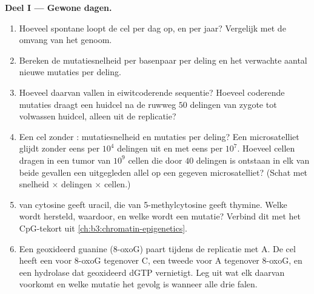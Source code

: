 \begin{problem}
\medskip
\noindent\textbf{Deel I --- Gewone dagen.}
\begin{enumerate}
  \item Hoeveel spontane  loopt de cel per dag op, en per jaar?
        Vergelijk met de omvang van het genoom.
  \item Bereken de mutatiesnelheid per basenpaar per deling en het
        verwachte aantal nieuwe mutaties per deling.
  \item Hoeveel daarvan vallen in eiwitcoderende sequentie? Hoeveel
        coderende mutaties draagt een huidcel na de ruwweg $50$
        delingen van zygote tot volwassen huidcel, alleen uit de
        replicatie?
  \item Een cel zonder : mutatiesnelheid en mutaties per
        deling? Een microsatelliet glijdt zonder  eens
        per $10^{4}$ delingen uit en met  eens per
        $10^{7}$. Hoeveel cellen dragen in een tumor van $10^{9}$
        cellen die door $40$ delingen is ontstaan in elk van beide
        gevallen een uitgegleden allel op een gegeven microsatelliet?
        (Schat met snelheid $\times$ delingen $\times$ cellen.)
  \item {} van cytosine geeft uracil, die van
        5-methylcytosine geeft thymine. Welke wordt hersteld, waardoor,
        en welke wordt een mutatie? Verbind dit met het CpG-tekort uit
        \cref{ch:b3:chromatin-epigenetics}.
  \item Een geoxideerd guanine (8-oxoG) paart tijdens de replicatie met
        A. De cel heeft een  voor 8-oxoG tegenover C, een
        tweede voor A tegenover 8-oxoG, en een hydrolase dat geoxideerd
        dGTP vernietigt. Leg uit wat elk daarvan voorkomt en welke
        mutatie het gevolg is wanneer alle drie falen.
\end{enumerate}


\end{problem}
